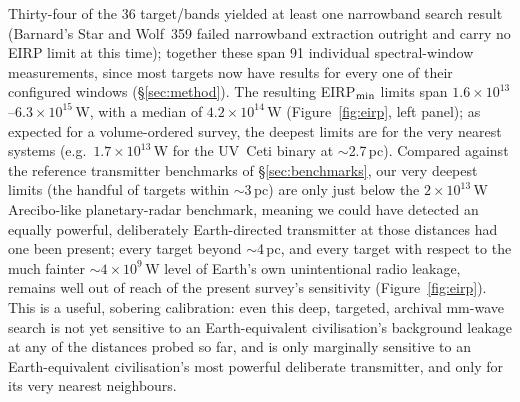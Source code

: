 \documentclass{openjournal}
\begin{document}
Thirty-four of the 36 target/bands yielded at least one narrowband search
result (Barnard's Star and Wolf~359 failed narrowband extraction
outright and carry no EIRP limit at this time); together these span 91
individual spectral-window measurements, since most targets now have
results for every one of their configured windows (\S\ref{sec:method}).
The resulting EIRP$_{\rm min}$ limits span
$1.6\times10^{13}$--$6.3\times10^{15}$\,W, with a median of
$4.2\times10^{14}$\,W (Figure~\ref{fig:eirp}, left panel); as expected
for a volume-ordered survey, the deepest limits are for the very nearest
systems (e.g.\ $1.7\times10^{13}$\,W for the UV~Ceti binary at $\sim$2.7\,pc).
Compared against the reference transmitter benchmarks of
\S\ref{sec:benchmarks}, our very deepest limits (the handful of targets
within $\sim$3\,pc) are only just below the $2\times10^{13}$\,W
Arecibo-like planetary-radar benchmark, meaning we could have detected an
equally powerful, deliberately Earth-directed transmitter at those
distances had one been present; every target beyond $\sim$4\,pc, and
every target with respect to the much fainter $\sim4\times10^{9}$\,W
level of Earth's own unintentional radio leakage, remains well out of
reach of the present survey's sensitivity (Figure~\ref{fig:eirp}). This
is a useful, sobering calibration: even this deep, targeted, archival
mm-wave search is not yet sensitive to an Earth-equivalent civilisation's
background leakage at any of the distances probed so far, and is only
marginally sensitive to an Earth-equivalent civilisation's most powerful
deliberate transmitter, and only for its very nearest neighbours.
\end{document}
